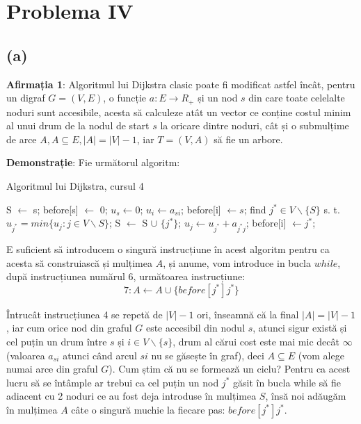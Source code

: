\documentclass[a4paper,12pt]{article}
\begin{document}
\section{Problema IV}

\subsection{(a)}
\textbf{Afirmația 1}: Algoritmul lui Dijkstra clasic poate fi modificat astfel încât, pentru un digraf $G=(V,E)$, o funcție $a:E \rightarrow R _{+}$ și un nod $s$ din care toate celelalte noduri sunt accesibile, acesta să calculeze atât un vector ce conține costul minim al unui drum de la nodul de start $s$ la oricare dintre noduri, cât și o submulțime de arce $A, A \subseteq E, |A| = |V|-1$, iar $T=(V,A)$ să fie un arbore.

\textbf{Demonstrație}: Fie următorul algoritm:

\begin{algorithm}
	\caption{Algoritmul lui Dijkstra, cursul 4}
	\begin{algorithmic}[1]
		\State S $\gets$ {s}; before[s] $\gets$ 0; $u_{s} \gets 0$;
			\State $u_{i} \gets a_{si}$; before[i] $\gets s$;
		\EndFor
			\State find $j^{*} \in V \backslash \{S\}$ s. t. $u_{j^{*}} = min \{u_j : j \in V \backslash S\}$;
			\State S $\gets$ S $ \cup $ $\{j^{*}\}$;
					\State $u_j \gets u_{j^{*}} + a_{j^{*}j}$; before[i] $\gets j^{*}$;
				\EndIf
			\EndFor
		\EndWhile
	\end{algorithmic}
\end{algorithm}

E suficient să introducem o singură instrucțiune în acest algoritm pentru ca acesta să construiască și mulțimea $A$, și anume, vom introduce in bucla $while$, după instrucțiunea numărul 6, următoarea instrucțiune: $$7: A \gets A \cup \{before[j^{*}]j^*\}$$

Întrucât instrucțiunea 4 se repetă de $|V|-1$ ori, înseamnă că la final $|A|=|V|-1$, iar cum orice nod din graful $G$ este accesibil din nodul $s$, atunci sigur există și cel puțin un drum între $s$ și $i \in V \backslash \{s\}$, drum al cărui cost este mai mic decât $\infty$ (valoarea $a_{si}$ atunci când arcul ${si}$ nu se găsește în graf), deci $A \subseteq E$ (vom alege numai arce din graful $G$). Cum știm că nu se formează un ciclu? Pentru ca acest lucru să se întâmple ar trebui ca cel puțin un nod $j^{*}$ găsit în bucla while să fie adiacent cu 2 noduri ce au fost deja introduse în mulțimea $S$, însă noi adăugăm în mulțimea $A$ câte o singură muchie la fiecare pas: $before[j^{*}]j^*$.
\end{document}
